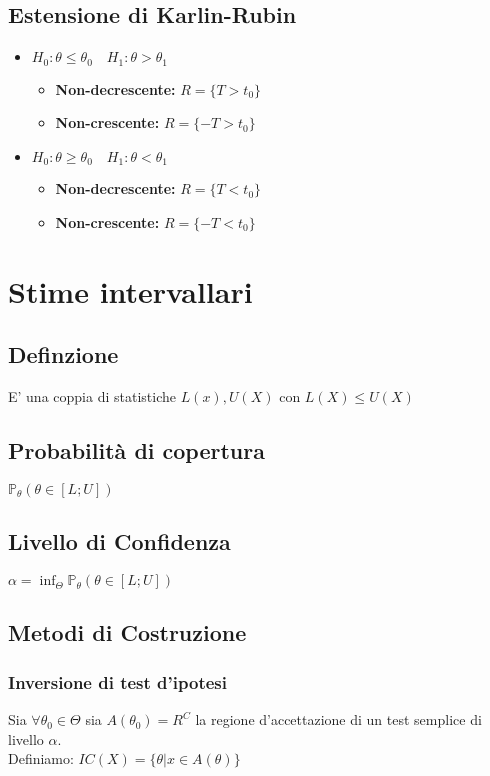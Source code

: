 \documentclass[a4paper,notitlepage]{report}%
\newcommand{\p}{\mathbb{P}} %
\begin{document}
\begin{multicols*}{2}
    \subsection*{Estensione di Karlin-Rubin}
    \begin{itemize}
        \item $H_0: \theta \leq \theta_0 \quad H_1: \theta > \theta_1$
            \begin{itemize}
                \item \textbf{Non-decrescente:} $R=\{T > t_0\}$
                \item \textbf{Non-crescente:} $R=\{-T > t_0\}$
            \end{itemize}
        \item $H_0: \theta \geq \theta_0 \quad H_1: \theta < \theta_1$
        \begin{itemize}
            \item \textbf{Non-decrescente:} $R=\{T < t_0\}$
            \item \textbf{Non-crescente:} $R=\{-T < t_0\}$
        \end{itemize}
    \end{itemize}


\section*{Stime intervallari}


    \subsection*{Definzione}
    E' una coppia di statistiche $L(x), U(X)$ con $L(X) \leq U(X)$


    \subsection*{Probabilità di copertura}
    $\p_\theta(\theta\in[L;U])$


    \subsection*{Livello di Confidenza}
    $\alpha = \inf_\Theta \p_\theta(\theta\in[L;U])$


    \subsection*{Metodi di Costruzione}

        \subsubsection*{Inversione di test d'ipotesi}
        Sia $\forall \theta_0 \in \Theta$ sia $A(\theta_0)=R^C$
        la regione d'accettazione di un test semplice di livello $\alpha$.\\
        Definiamo:
        $IC(X)=\{\theta| x\in A(\theta)  \}$



\end{multicols*}
\end{document}
